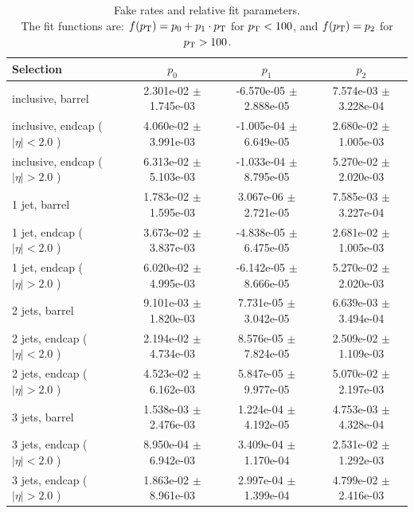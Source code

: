 \begin{table}
  \small
  \begin{center}
    \begin{tabular}{l|c|c|c}
      Selection & $p_{0}$ & $p_{1}$ & $p_{2}$ \\ 
      \hline 
      \hline 
      inclusive, barrel & 2.301e-02 $\pm$ 1.745e-03 & -6.570e-05 $\pm$ 2.888e-05 & 7.574e-03 $\pm$ 3.228e-04 \\ 
      inclusive, endcap ($|\eta| < 2.0$ ) & 4.060e-02 $\pm$ 3.991e-03 & -1.005e-04 $\pm$ 6.649e-05 & 2.680e-02 $\pm$ 1.005e-03 \\ 
      inclusive, endcap ($|\eta| > 2.0$ ) & 6.313e-02 $\pm$ 5.103e-03 & -1.033e-04 $\pm$ 8.795e-05 & 5.270e-02 $\pm$ 2.020e-03 \\ 
      \hline 
      1 jet, barrel & 1.783e-02 $\pm$ 1.595e-03 & 3.067e-06 $\pm$ 2.721e-05 & 7.585e-03 $\pm$ 3.227e-04 \\ 
      1 jet, endcap ($|\eta| < 2.0$ ) & 3.673e-02 $\pm$ 3.837e-03 & -4.838e-05 $\pm$ 6.475e-05 & 2.681e-02 $\pm$ 1.005e-03 \\ 
      1 jet, endcap ($|\eta| > 2.0$ ) & 6.020e-02 $\pm$ 4.995e-03 & -6.142e-05 $\pm$ 8.666e-05 & 5.270e-02 $\pm$ 2.020e-03 \\ 
      \hline 
      2 jets, barrel & 9.101e-03 $\pm$ 1.820e-03 & 7.731e-05 $\pm$ 3.042e-05 & 6.639e-03 $\pm$ 3.494e-04 \\ 
      2 jets, endcap ($|\eta| < 2.0$ ) & 2.194e-02 $\pm$ 4.734e-03 & 8.576e-05 $\pm$ 7.824e-05 & 2.509e-02 $\pm$ 1.109e-03 \\ 
      2 jets, endcap ($|\eta| > 2.0$ ) & 4.523e-02 $\pm$ 6.162e-03 & 5.847e-05 $\pm$ 9.977e-05 & 5.070e-02 $\pm$ 2.197e-03 \\ 
      \hline 
      3 jets, barrel & 1.538e-03 $\pm$ 2.476e-03 & 1.224e-04 $\pm$ 4.192e-05 & 4.753e-03 $\pm$ 4.328e-04 \\ 
      3 jets, endcap ($|\eta| < 2.0$ ) & 8.950e-04 $\pm$ 6.942e-03 & 3.409e-04 $\pm$ 1.170e-04 & 2.531e-02 $\pm$ 1.292e-03 \\ 
      3 jets, endcap ($|\eta| > 2.0$ ) & 1.863e-02 $\pm$ 8.961e-03 & 2.997e-04 $\pm$ 1.399e-04 & 4.799e-02 $\pm$ 2.416e-03 \\ 
    \end{tabular}   
    \caption{
      Fake rates and relative fit parameters. \\ 
      The fit functions are: 
      $f(\mbox{\ensuremath{p_{\text{T}}}}) = p_{0} + p_{1} \cdot \mbox{\ensuremath{p_{\text{T}}}}$ for $\mbox{\ensuremath{p_{\text{T}}}}<100$, and 
      $f(\mbox{\ensuremath{p_{\text{T}}}}) = p_{2}$ for $\mbox{\ensuremath{p_{\text{T}}}} > 100$.
    }
    \label{tab:fakeRates}
  \end{center}
\end{table}

